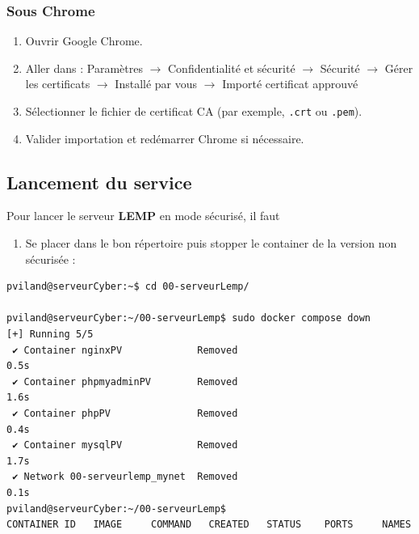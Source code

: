 \documentclass[french, 12pt]{article}%
\begin{document}
\subsubsection{Sous Chrome}
\begin{enumerate}
  \item Ouvrir Google Chrome.
  \item Aller dans : 
	Paramètres $\rightarrow$ Confidentialité et sécurité $\rightarrow$ Sécurité $\rightarrow$ Gérer les certificats   $\rightarrow$ Installé par vous  $\rightarrow$ Importé certificat approuvé
  \item Sélectionner le fichier de certificat CA (par exemple, \texttt{.crt} ou \texttt{.pem}).
  \item Valider importation et redémarrer Chrome si nécessaire.
\end{enumerate}

\subsection{Lancement du service}


Pour lancer le serveur \textbf{LEMP} en mode sécurisé, il faut 
\begin{enumerate}
\item Se placer dans le bon répertoire puis stopper le container de la version non sécurisée : 
\end{enumerate}

\begin{lstlisting}[style=commande]
pviland@serveurCyber:~$ cd 00-serveurLemp/

pviland@serveurCyber:~/00-serveurLemp$ sudo docker compose down
[+] Running 5/5
 ✔ Container nginxPV             Removed                                   0.5s 
 ✔ Container phpmyadminPV        Removed                                   1.6s 
 ✔ Container phpPV               Removed                                   0.4s 
 ✔ Container mysqlPV             Removed                                   1.7s 
 ✔ Network 00-serveurlemp_mynet  Removed                                   0.1s 
pviland@serveurCyber:~/00-serveurLemp$
CONTAINER ID   IMAGE     COMMAND   CREATED   STATUS    PORTS     NAMES
\end{lstlisting}
\end{document}
